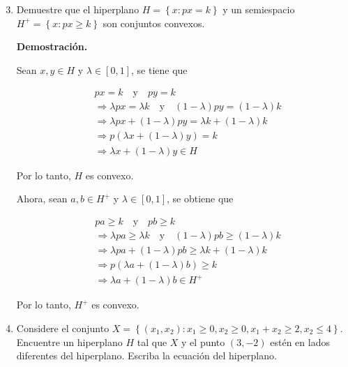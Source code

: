 \documentclass[fleqn, 12pt]{article}
\begin{document}
	\begin{enumerate}
		\setcounter{enumi}{2}
		\item Demuestre que el hiperplano $ H = \left\{ x \colon px = k \right\} $ y un semiespacio $ H^+ = \left\{ x \colon px \geq k \right\} $ son conjuntos convexos.
		
		\textbf{Demostración.}

		Sean $ x,y \in H $ y $ \lambda \in \left[ 0,1 \right] $, se tiene que

		\begin{align*}
			& px = k \quad \text{y} \quad py = k \\
			& \Longrightarrow \lambda px = \lambda k \quad \text{y} \quad \left( 1 - \lambda \right) py = \left( 1 - \lambda \right) k \\
			& \Longrightarrow \lambda px + \left( 1 - \lambda \right) py = \lambda k + \left( 1 - \lambda \right) k \\
			& \Longrightarrow p \left( \lambda x + \left( 1 - \lambda \right) y \right) = k \\
			& \Longrightarrow \lambda x + \left( 1 - \lambda \right) y \in H
		\end{align*}

		Por lo tanto, $ H $ es convexo.

		Ahora, sean $ a,b \in H^+ $ y $ \lambda \in \left[ 0,1 \right] $, se obtiene que

		\begin{align*}
			& pa \geq k \quad \text{y} \quad pb \geq k \\
			& \Longrightarrow \lambda pa \geq \lambda k \quad \text{y} \quad \left( 1 - \lambda \right) pb \geq \left( 1 - \lambda \right) k \\
			& \Longrightarrow \lambda pa + \left( 1 - \lambda \right) pb \geq \lambda k + \left( 1 - \lambda \right) k \\
			& \Longrightarrow p \left( \lambda a + \left( 1 - \lambda \right) b \right) \geq k \\
			& \Longrightarrow \lambda a + \left( 1 - \lambda \right) b \in H^+
		\end{align*}

		Por lo tanto, $ H^+ $ es convexo.

		\item Considere el conjunto $ X = \left\{ \left( x_1, x_2 \right) \colon x_1 \geq 0, x_2 \geq 0, x_1 + x_2 \geq 2, x_2 \leq 4 \right\} $. Encuentre un hiperplano $ H $ tal que $ X $ y el punto $ \left( 3, -2 \right) $ estén en lados diferentes del hiperplano. Escriba la ecuación del hiperplano.
		

\end{enumerate}
\end{document}
